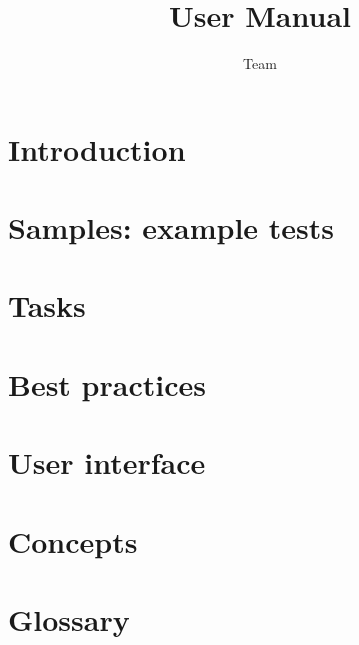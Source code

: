 \documentclass[en,a4paper,twoside,manual]{bxreport}
\begin{document}
\title{\app{} User Manual}
\author*{\app{} Team}{}
\maketitle



\tableofcontents
\renewcommand{\bxcomment}[2]{}%
\clearpage
\chapter{Introduction}
\label{Introduction}


\clearpage
\chapter{Samples: example tests}
\label{Samples}


\clearpage
 \chapter{Tasks}
 \label{Tasks}


\clearpage
\chapter{Best practices}
\label{BestPractices}


\clearpage
\chapter{User interface}
\label{ChapterUserInterface}


\clearpage
\chapter{Concepts}
\label{Concepts}


\clearpage
\chapter{Glossary}
\label{Glossary}


\clearpage
\printindex
\end{document}
